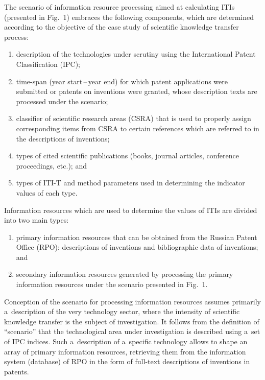 \begin{multicols}{2}
    
    The scenario of information resource processing aimed at calculating ITIs 
(presented in Fig.~1) embraces the following components, which are determined 
according to the objective of the case study of scientific knowledge transfer process:
    \begin{enumerate}[(1)]
\item description of the technologies under scrutiny using the International 
Patent Classification (IPC);
\item time-span (year start\,--\,year end) for which patent applications were 
submitted or patents on inventions were granted, whose description texts are 
processed under the scenario;
\item classifier of scientific research areas (CSRA) that is used to properly 
assign corresponding items from CSRA to certain references which are referred 
to in the descriptions of inventions;
\item types of cited scientific publications (books, journal articles, conference 
proceedings, etc.); and
\item types of ITI-T and method parameters used in determining the indicator 
values of each type.
\end{enumerate}




    Information resources which are used to determine the values of ITIs are divided 
into two main types:
    \begin{enumerate}[(1)]
    \item  primary information resources that can be obtained from the Russian 
Patent Office (RPO): descriptions of inventions and bibliographic data of inventions; and
    \item secondary information resources generated by processing the primary 
information resources under the scenario presented in Fig.~1.
    \end{enumerate}
    
    Conception of the scenario for processing information resources assumes 
primarily a~description of the very technology sector, where the intensity of scientific 
knowledge transfer is the subject of investigation. It follows from the definition of 
``scenario'' that the technological area under investigation is described using a~set of 
IPC indices. Such a~description of a~specific technology allows to shape an array of 
primary information resources, retrieving them from the information system 
(database) of RPO in the form of full-text descriptions of inventions in patents.
    

\end{multicols}
